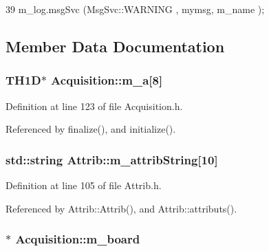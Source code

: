 \begin{DoxyCode}
39 { m_log.msgSvc (MsgSvc::WARNING , mymsg, m_name ); }
\end{DoxyCode}


\subsection{Member Data Documentation}
\hypertarget{classAcquisition_a88963f722bfcde824882f6312a44e825}{
\subsubsection[{m\_\-a}]{\setlength{\rightskip}{0pt plus 5cm}TH1D$\ast$ {\bf Acquisition::m\_\-a}\mbox{[}8\mbox{]}}}
\label{classAcquisition_a88963f722bfcde824882f6312a44e825}


Definition at line 123 of file Acquisition.h.

Referenced by finalize(), and initialize().\hypertarget{classAttrib_a3414521d7a82476e874b25a5407b5e63}{
\subsubsection[{m\_\-attribString}]{\setlength{\rightskip}{0pt plus 5cm}std::string {\bf Attrib::m\_\-attribString}\mbox{[}10\mbox{]}}}
\label{classAttrib_a3414521d7a82476e874b25a5407b5e63}


Definition at line 105 of file Attrib.h.

Referenced by Attrib::Attrib(), and Attrib::attributs().\hypertarget{classAcquisition_a9b0db99be79d61ae78dae8a9e4efceab}{
\subsubsection[{m\_\-board}]{$\ast$ {\bf Acquisition::m\_\-board}}}
\label{classAcquisition_a9b0db99be79d61ae78dae8a9e4efceab}



